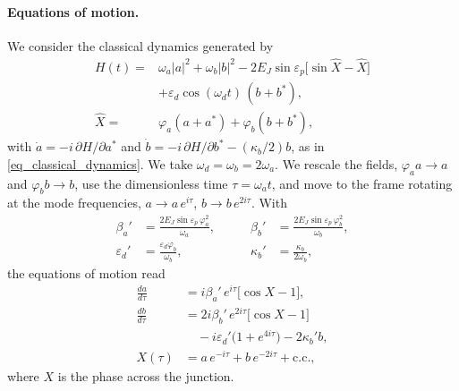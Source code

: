 \documentclass[aps,prx,reprint,floatfix,amsmath,amssymb,longbibliography]{revtex4-2}
\begin{document}
\paragraph*{Equations of motion.}
We consider the classical dynamics generated by
\begin{equation}
\begin{split}
    H(t) = {}& \omega_a |a|^2 + \omega_b |b|^2
    - 2E_J\sin\varepsilon_p\bigl[\sin\hat X - \hat X\bigr]\\
    &+ \varepsilon_d\cos(\omega_d t)\,(b+b^*),\\
    \hat X = {}& \varphi_a(a+a^*) + \varphi_b(b+b^*),
\end{split}
\label{eq:app_H}
\end{equation}
with $\dot a = -i\,\partial H/\partial a^*$ and $\dot b = -i\,\partial H/\partial b^* - (\kappa_b/2) b$, as in \cref{eq_classical_dynamics}.
We take $\omega_d=\omega_b=2\omega_a$. We rescale the fields, $\varphi_a a\to a$ and $\varphi_b b\to b$, use the dimensionless time $\tau=\omega_a t$, and move to the frame rotating at the mode frequencies, $a\to a\,e^{i\tau}$, $b\to b\,e^{2i\tau}$. With
\begin{equation}
\begin{aligned}
    \beta_a' &= \frac{2E_J\sin\varepsilon_p\,\varphi_a^2}{\omega_a},&\qquad
    \beta_b' &= \frac{2E_J\sin\varepsilon_p\,\varphi_b^2}{\omega_b},\\
    \varepsilon_d' &= \frac{\varepsilon_d\varphi_b}{\omega_b},&\qquad
    \kappa_b' &= \frac{\kappa_b}{2\omega_b},
\end{aligned}
\end{equation}
the equations of motion read
\begin{equation}
\begin{split}
    \frac{da}{d\tau} &= i\beta_a'\,e^{i\tau}\bigl[\cos X - 1\bigr],\\
    \frac{db}{d\tau} &= 2i\beta_b'\,e^{2i\tau}\bigl[\cos X - 1\bigr]\\
    &\quad - i\varepsilon_d'\bigl(1+e^{4i\tau}\bigr) - 2\kappa_b' b,\\
    X(\tau) &= a\,e^{-i\tau} + b\,e^{-2i\tau} + \text{c.c.},
\end{split}
\label{eq:app_eom}
\end{equation}
where $X$ is the phase across the junction.
\end{document}
